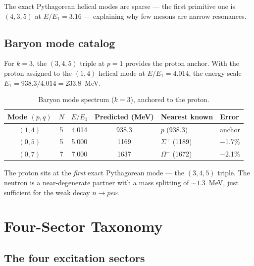 \documentclass[11pt,a4paper]{article}
\begin{document}
The exact Pythagorean helical modes are sparse --- the first primitive one is $(4,3,5)$ at $E/E_1 = 3.16$ --- explaining why few mesons are narrow resonances.

\subsection{Baryon mode catalog}

For $k=3$, the $(3,4,5)$ triple at $p=1$ provides the proton anchor. With the proton assigned to the $(1,4)$ helical mode at $E/E_1 = 4.014$, the energy scale $E_1 = 938.3/4.014 = 233.8$~MeV.

\begin{table}[h]
\centering
\caption{Baryon mode spectrum ($k=3$), anchored to the proton.}
\label{tab:baryon-modes}
\begin{tabular}{@{}ccccll@{}}
\toprule
Mode $(p,q)$ & $N$ & $E/E_1$ & Predicted (MeV) & Nearest known & Error \\
\midrule
$(1,4)$ & 5 & 4.014 & 938.3 & $p$ (938.3) & anchor \\
$(0,5)$ & 5 & 5.000 & 1169 & $\Sigma^+$ (1189) & $-$1.7\% \\
$(0,7)$ & 7 & 7.000 & 1637 & $\Omega^-$ (1672) & $-$2.1\% \\
\bottomrule
\end{tabular}
\end{table}

The proton sits at the \emph{first} exact Pythagorean mode --- the $(3,4,5)$ triple. The neutron is a near-degenerate partner with a mass splitting of ${\sim}1.3$~MeV, just sufficient for the weak decay $n \to pe\bar\nu$.

\section{Four-Sector Taxonomy}
\label{sec:taxonomy}

\subsection{The four excitation sectors}
\end{document}
